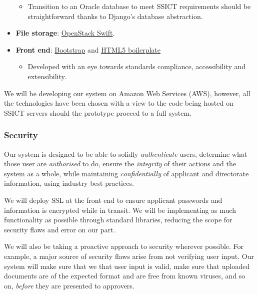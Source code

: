 \documentclass[12pt,a4paper,twosided]{article}
\begin{document}
\begin{itemize}
  \begin{itemize}
  \itemsep1pt\parskip0pt
  \item
    Transition to an Oracle database to meet SSICT requirements should
    be straightforward thanks to Django's database abstraction.
  \end{itemize}
\item
  \textbf{File storage}: \href{http://swift.openstack.org}{OpenStack
  Swift}.
\item
  \textbf{Front end}: \href{http://getbootstrap.com/}{Bootstrap} and
  \href{http://html5boilerplate.com/}{HTML5 boilerplate}

  \begin{itemize}
  \itemsep1pt\parskip0pt
  \item
    Developed with an eye towards standards compliance, accessibility
    and extensibility.
  \end{itemize}
\end{itemize}

We will be developing our system on Amazon Web Services (AWS), however,
all the technologies have been chosen with a view to the code being
hosted on SSICT servers should the prototype proceed to a full system.

\subsubsection{Security}

Our system is designed to be able to solidly \emph{authenticate} users,
determine what those user are \emph{authorised} to do, ensure the
\emph{integrity} of their actions and the system as a whole, while
maintaining \emph{confidentially} of applicant and directorate
information, using industry best practices.

We will deploy SSL at the front end to ensure applicant passwords and
information is encrypted while in transit. We will be implementing as
much functionality as possible through standard libraries, reducing the
scope for security flaws and error on our part.

We will also be taking a proactive approach to security wherever
possible. For example, a major source of security flaws arise from not
verifying user input. Our system will make sure that we that user input
is valid, make sure that uploaded documents are of the expected format
and are free from known viruses, and so on, \emph{before} they are
presented to approvers.
\end{document}

